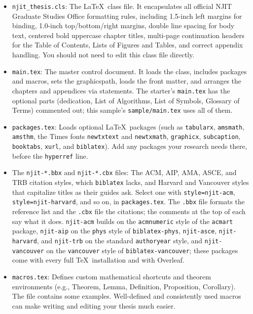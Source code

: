 \begin{itemize}
\emergencystretch=2.5em
  \item \texttt{njit\_thesis.cls}: The \LaTeX\ class file. It encapsulates all official NJIT Graduate Studies Office formatting rules, including 1.5-inch left margins for binding, 1.0-inch top/bottom/right margins, double line spacing for body text, centered bold uppercase chapter titles, multi-page continuation headers for the Table of Contents, Lists of Figures and Tables, and correct appendix handling. You should not need to edit this class file directly.

  \item \texttt{main.tex}: The master control document. It loads the class, includes packages and macros, sets the graphicspath, loads the front matter, and arranges the chapters and appendices via \verb++ statements. The starter's \texttt{main.tex} has the optional parts (dedication, List of Algorithms, List of Symbols, Glossary of Terms) commented out; this sample's \texttt{sample/main.tex} uses all of them.

  \item \texttt{packages.tex}: Loads optional \LaTeX\ packages (such as \texttt{tabularx}, \texttt{amsmath}, \texttt{amsthm}, the Times fonts \texttt{newtxtext} and \texttt{newtxmath}, \texttt{graphicx}, \texttt{subcaption}, \texttt{booktabs}, \texttt{xurl}, and \texttt{biblatex}). Add any packages your research needs there, before the \texttt{hyperref} line.

  \item The \texttt{njit-*.bbx} and \texttt{njit-*.cbx} files: The ACM, AIP, AMA, ASCE, and TRB citation styles, which \texttt{biblatex} lacks, and Harvard and Vancouver styles that capitalize titles as their guides ask. Select one with \texttt{style=njit-acm}, \texttt{style=njit-harvard}, and so on, in \texttt{packages.tex}. The \texttt{.bbx} file formats the reference list and the \texttt{.cbx} file the citations; the comments at the top of each say what it does. \texttt{njit-acm} builds on the \texttt{acmnumeric} style of the \texttt{acmart} package, \texttt{njit-aip} on the \texttt{phys} style of \texttt{biblatex-phys}, \texttt{njit-asce}, \texttt{njit-harvard}, and \texttt{njit-trb} on the standard \texttt{authoryear} style, and \texttt{njit-vancouver} on the \texttt{vancouver} style of \texttt{biblatex-vancouver}; these packages come with every full \TeX\ installation and with Overleaf.

  \item \texttt{macros.tex}: Defines custom mathematical shortcuts and theorem environments (e.g., Theorem, Lemma, Definition, Proposition, Corollary). The file contains some examples. Well-defined and consistently used macros can make writing and editing your thesis much easier.


\end{itemize}
